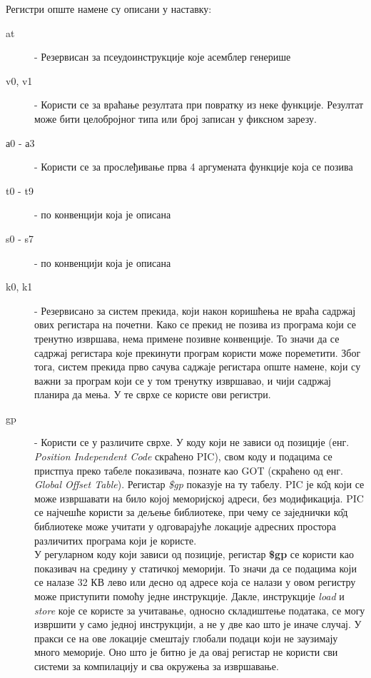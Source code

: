 \documentclass[12pt,oneside]{memoir}
\begin{document}
Регистри опште намене су описани у наставку:
\begin{description}
  \item[at] - Резервисан за псеудоинструкције које асемблер генерише
  \item[v0, v1] - Користи се за враћање резултата при повратку из неке функције. Резултат може бити целобројног типа или број записан у фиксном зарезу.
  \item[а0 - а3] - Користи се за прослеђивање прва 4 аргумената функције која се позива
  \item[t0 - t9] - по конвенцији која је описана 
  \item[s0 - s7] - по конвенцији која је описана 
  \item[k0, k1] - Резервисано за систем прекида, који након коришћења не враћа садржај ових регистара на почетни. Како се прекид не позива из програма који се тренутно извршава, нема примене позивне конвенције. То значи да се садржај регистара које прекинути програм користи може пореметити. Због тога, систем прекида прво сачува саджаје регистара опште намене, који су важни за програм који се у том тренутку извршавао, и чији садржај планира да мења. У те сврхе се користе ови регистри.
  \item[gp] - Користи се у различите сврхе. У коду који  не зависи од позиције (енг. \textit{Position Independent Code} скраћено PIC), свом коду и подацима се пристпуа преко табеле показивача, познате као GOT (скраћено од енг. \textit{Global Offset Table}). Регистар \textit{\$gp} показује на ту табелу. PIC је к\^{о}д који се може извршавати на било којој меморијској адреси, без модификација. PIC се најчешће користи за дељење библиотеке, при чему се заједнички к\^{о}д библиотеке може учитати у одговарајуће локације адресних простора различитих програма који је користе. \\
  У регуларном коду који зависи од позиције, регистар \textbf{\$gp} се користи као показивач на средину у статичкој меморији. То значи да се подацима који се налазе 32 КВ лево или десно од адресе која се налази у овом регистру може приступити помоћу једне инструкције. Дакле, инструкције \textit{load} и \textit{store} које се користе за учитавање, односно складиштење података, се могу извршити у само једној инструкцији, а не у две као што је иначе случај. У пракси се на ове локације смештају глобали подаци који не заузимају много меморије. Оно што је битно је да овај регистар не користи сви системи за компилацију и сва окружења за извршавање.
  

\end{description}
\end{document}
